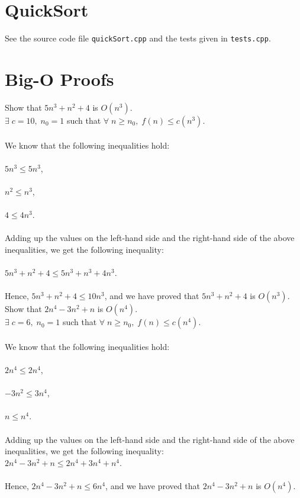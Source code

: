 \documentclass{article}
\begin{document}
    \section{QuickSort}

    See the source code file \texttt{quickSort.cpp} and the tests given in
    \texttt{tests.cpp}.

    \section{Big-O Proofs}

    \vspace{2mm}
     Show that $5n^3+n^2+4$ is $O(n^3)$.\\

    $\exists \; c=10, \; n_0=1$ such that $\forall \; n \geq n_0, \; f(n) \leq c(n^3)$.\\ \\
    We know that the following inequalities hold:\\ \\
    $5n^3 \leq 5n^3$,\\ \\
    $n^2 \leq n^3$,\\ \\
    $4 \leq 4n^3$.\\ \\
    Adding up the values on the left-hand side and the right-hand side of the above inequalities,
    we get the following inequality: \\ \\
    $5n^3+n^2+4 \leq 5n^3+n^3+4n^3$.\\ \\
    Hence, $5n^3+n^2+4 \leq 10n^3$, and we have proved that $5n^3+n^2+4$ is $O(n^3)$.\\

    \vspace{1cm}
     Show that $2n^4-3n^2+n$ is $O(n^4)$. \\

     $\exists \; c=6, \; n_0=1$ such that $\forall \; n \geq n_0, \; f(n) \leq c(n^4)$.\\ \\
     We know that the following inequalities hold:\\ \\
     $2n^4 \leq 2n^4$,\\ \\
     $-3n^2 \leq 3n^4$,\\ \\
     $n \leq n^4$.\\ \\
     Adding up the values on the left-hand side and the right-hand side of the above inequalities,
     we get the following inequality: \\
     $2n^4-3n^2+n \leq 2n^4+3n^4+n^4$.\\ \\
     Hence, $2n^4-3n^2+n \leq 6n^4$, and we have proved that $2n^4-3n^2+n$ is $O(n^4)$.\\
 
\end{document}
